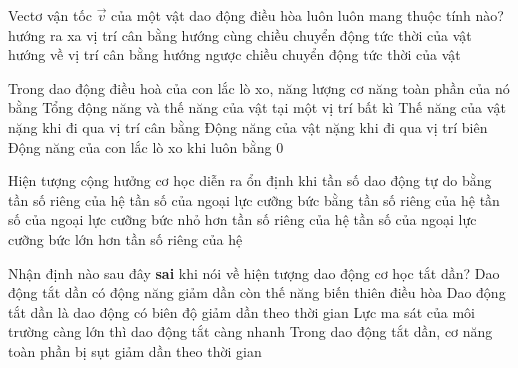 \begin{ex}	Vectơ vận tốc $\vec{v}$ của một vật dao động điều hòa luôn luôn mang thuộc tính nào?
	\choice
	{hướng ra xa vị trí cân bằng}
	{\True hướng cùng chiều chuyển động tức thời của vật}
	{hướng về vị trí cân bằng}
	{hướng ngược chiều chuyển động tức thời của vật}
\end{ex}

\begin{ex}	Trong dao động điều hoà của con lắc lò xo, năng lượng cơ năng toàn phần của nó bằng
	\choice
	{\True Tổng động năng và thế năng của vật tại một vị trí bất kì}
	{Thế năng của vật nặng khi đi qua vị trí cân bằng}
	{Động năng của vật nặng khi đi qua vị trí biên}
	{Động năng của con lắc lò xo khi luôn bằng 0}
\end{ex}
\begin{ex}	Hiện tượng cộng hưởng cơ học diễn ra ổn định khi
	\choice
	{tần số dao động tự do bằng tần số riêng của hệ}
	{\True tần số của ngoại lực cưỡng bức bằng tần số riêng của hệ}
	{tần số của ngoại lực cưỡng bức nhỏ hơn tần số riêng của hệ}
	{tần số của ngoại lực cưỡng bức lớn hơn tần số riêng của hệ}
\end{ex}

\begin{ex}	Nhận định nào sau đây \textbf{sai} khi nói về hiện tượng dao động cơ học tắt dần?
	\choice
	{\True Dao động tắt dần có động năng giảm dần còn thế năng biến thiên điều hòa}
	{Dao động tắt dần là dao động có biên độ giảm dần theo thời gian}
	{Lực ma sát của môi trường càng lớn thì dao động tắt càng nhanh}
	{Trong dao động tắt dần, cơ năng toàn phần bị sụt giảm dần theo thời gian}
\end{ex}

